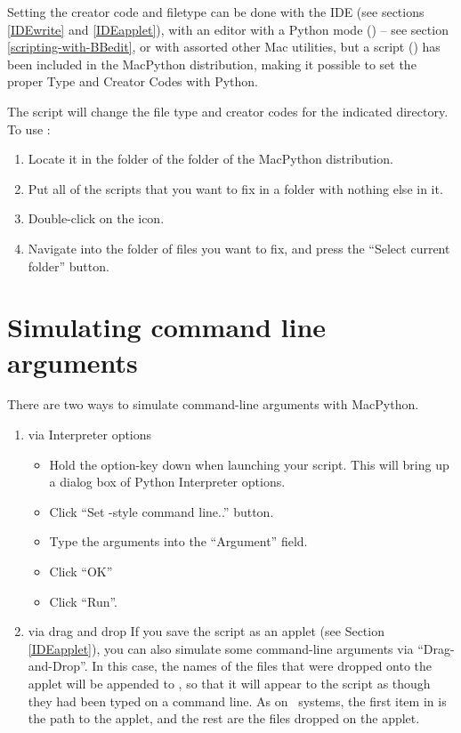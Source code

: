 Setting the creator code and filetype can be done with the IDE (see
sections \ref{IDEwrite} and \ref{IDEapplet}), with an editor with a
Python mode () -- see section
\ref{scripting-with-BBedit}, or with assorted other Mac utilities, but
a script () has been included in the MacPython
distribution, making it possible to set the proper Type and Creator
Codes with Python.

The  script will change the file type and
creator codes for the indicated directory.  To use
:

\begin{enumerate}
\item
Locate it in the  folder of the  folder of the
MacPython distribution.

\item
Put all of the scripts that you want to fix in a folder with nothing
else in it.

\item
Double-click on the  icon.

\item
Navigate into the folder of files you want to fix, and press the
``Select current folder'' button.
\end{enumerate}


\section{Simulating command line arguments
         \label{argv}}

There are two ways to simulate command-line arguments with MacPython.
 
\begin{enumerate}
\item via Interpreter options
\begin{itemize} %
  \item Hold the option-key down when launching your script. This will
        bring up a dialog box of Python Interpreter options.
  \item Click ``Set \UNIX-style command line..'' button. 
  \item Type the arguments into the ``Argument'' field.
  \item Click ``OK''
  \item Click ``Run''.
\end{itemize} %

\item via drag and drop
If you save the script as an applet (see Section \ref{IDEapplet}), you
can also simulate some command-line arguments via
``Drag-and-Drop''. In this case, the names of the files that were
dropped onto the applet will be appended to , so that
it will appear to the script as though they had been typed on a
command line.  As on \UNIX\ systems, the first item in  is
the path to the applet, and the rest are the files dropped on the
applet.
\end{enumerate}


